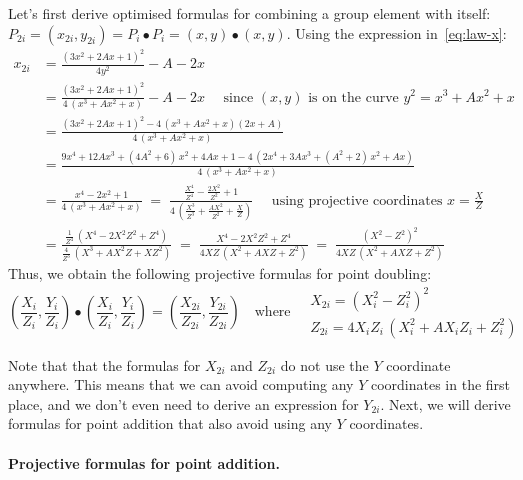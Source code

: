 \documentclass[manuscript]{acmart}
\begin{document}
Let's first derive optimised formulas for combining a group element with itself:
$P_{2i} = (x_{2i}, y_{2i}) = P_i \bullet P_i = (x, y) \bullet (x, y)$.
Using the expression in~\eqref{eq:law-x}:
\begingroup\allowdisplaybreaks
\begin{align}
x_{2i} &= \frac{(3x^2 + 2Ax + 1)^2}{4y^2} - A - 2x \nonumber\\[5pt]
&= \frac{(3x^2 + 2Ax + 1)^2}{4\,(x^3 + Ax^2 + x)} - A - 2x 
    \quad\text{ since } (x, y) \text { is on the curve } y^2 = x^3 + Ax^2 + x \nonumber\\[5pt]
&= \frac{(3x^2 + 2Ax + 1)^2 - 4\,(x^3 + Ax^2 + x)(2x + A)}{4\,(x^3 + Ax^2 + x)} \nonumber\\[5pt]
&= \frac{9x^4 + 12Ax^3 + (4A^2 + 6)\,x^2 + 4Ax + 1 -4\,(2x^4 + 3Ax^3 + (A^2 + 2)\,x^2 + Ax)}{4\,(x^3 + Ax^2 + x)} \nonumber\\[5pt]
&= \frac{x^4 -2x^2 + 1}{4\,(x^3 + Ax^2 + x)} 
    \;=\; \frac{\frac{X^4}{Z^4} - \frac{2X^2}{Z^2} + 1}{4\,\left(\frac{X^3}{Z^3} + \frac{AX^2}{Z^2} + \frac{X}{Z}\right)}
    \quad\text{ using projective coordinates } x=\frac{X}{Z} \label{eq:alt-doubling}\\[5pt]
&= \frac{\frac{1}{Z^4}\,(X^4 - 2X^2 Z^2 + Z^4)}{\frac{4}{Z^3}\,(X^3 + AX^2 Z + X Z^2)}
    \;=\; \frac{X^4 - 2X^2 Z^2 + Z^4}{4XZ\,(X^2 + AX Z + Z^2)}
    \;=\; \frac{(X^2 - Z^2)^2}{4XZ\,(X^2 + AX Z + Z^2)} \nonumber
\end{align}
\endgroup
Thus, we obtain the following projective formulas for point doubling:
\begin{equation}
\left(\frac{X_i}{Z_i}, \frac{Y_i}{Z_i}\right) \bullet \left(\frac{X_i}{Z_i}, \frac{Y_i}{Z_i}\right) =
\left(\frac{X_{2i}}{Z_{2i}}, \frac{Y_{2i}}{Z_{2i}}\right) \quad\text{where}\quad
\begin{array}{l}
    X_{2i} = (X_i^2 - Z_i^2)^2 \\[5pt]
    Z_{2i} = 4X_i Z_i\,(X_i^2 + AX_i Z_i + Z_i^2)
\end{array}\label{eq:projective-double}
\end{equation}

Note that that the formulas for $X_{2i}$ and $Z_{2i}$ do not use the $Y$ coordinate anywhere.
This means that we can avoid computing any $Y$ coordinates in the first place, and we don't even need to derive an expression for $Y_{2i}$.
Next, we will derive formulas for point addition that also avoid using any $Y$ coordinates.

\paragraph{Projective formulas for point addition.}
\end{document}
